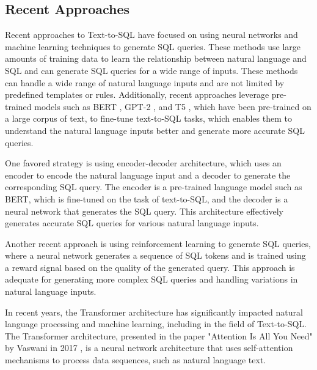 \subsection{Recent Approaches}

Recent approaches to Text-to-SQL have focused on using neural networks and machine learning techniques to generate SQL queries. These methods use large amounts of training data to learn the relationship between natural language and SQL and can generate SQL queries for a wide range of inputs. These methods can handle a wide range of natural language inputs and are not limited by predefined templates or rules. Additionally, recent approaches leverage pre-trained models such as \ac{BERT} \cite{devlin-etal-2019-bert}, GPT-2 \cite{radford2019language}, and T5 \cite{raffel_exploring_2020}, which have been pre-trained on a large corpus of text, to fine-tune text-to-SQL tasks, which enables them to understand the natural language inputs better and generate more accurate SQL queries.

One favored strategy is using encoder-decoder architecture, which uses an encoder to encode the natural language input and a decoder to generate the corresponding SQL query. The encoder is a pre-trained language model such as BERT, which is fine-tuned on the task of text-to-SQL, and the decoder is a neural network that generates the SQL query. This architecture effectively generates accurate SQL queries for various natural language inputs.

Another recent approach is using reinforcement learning to generate SQL queries, where a neural network generates a sequence of SQL tokens and is trained using a reward signal based on the quality of the generated query. This approach is adequate for generating more complex SQL queries and handling variations in natural language inputs.

In recent years, the Transformer architecture has significantly impacted natural language processing and machine learning, including in the field of Text-to-SQL. The Transformer architecture, presented in the paper "Attention Is All You Need" by Vaswani in 2017 \cite{https://doi.org/10.48550/arxiv.1706.03762}, is a neural network architecture that uses self-attention mechanisms to process data sequences, such as natural language text.


